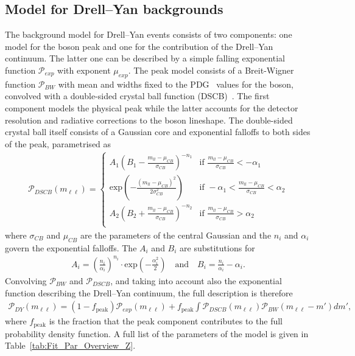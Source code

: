 \subsection{Model for Drell--Yan backgrounds}
\label{sec:Zmodel}
The background model for Drell--Yan events consists of two components: one model for the \Z boson peak and one for the contribution of the Drell--Yan continuum. The latter one can be described by a simple falling exponential function $\mathcal{P}_{exp}$ with exponent $\mu_{exp}$. The peak model consists of a Breit-Wigner function $\mathcal{P}_{BW}$ with mean and widths fixed to the PDG~\cite{PDG} values for the \Z boson, convolved with a double-sided crystal ball function (DSCB)~\cite{Crystal}. The first component models the physical peak while the latter accounts for the detector resolution and radiative corrections to the \Z boson lineshape. The double-sided crystal ball itself consists of a Gaussian core and exponential falloffs to both sides of the peak, parametrised as
\begin{eqnarray*}
\mathcal{P}_{DSCB}(m_{\ell\ell}) = \begin{cases} A_{1} (B_{1}-\frac{m_{ll}-\mu_{CB}}{\sigma_{CB}})^{-n_{1}} &\mbox{if } \frac{m_{ll}-\mu_{CB}}{\sigma_{CB}}<-\alpha_{1} \\
\textrm{exp}\left(-\frac{(m_{ll}-\mu_{CB})^2}{2\sigma_{CB}^2}\right) &\mbox{if } -\alpha_{1}<\frac{m_{ll}-\mu_{CB}}{\sigma_{CB}}<\alpha_{2} \\
A_{2} (B_{2}+\frac{m_{ll}-\mu_{CB}}{\sigma_{CB}})^{-n_{2}} &\mbox{if } \frac{m_{ll}-\mu_{CB}}{\sigma_{CB}}>\alpha_{2} \\
\end{cases}
\end{eqnarray*}
where $\sigma_{CB}$ and $\mu_{CB}$ are the parameters of the central Gaussian and the $n_i$ and $\alpha_i$ govern the exponential falloffs. The $A_i$ and $B_i$ are substitutions for
\begin{eqnarray*}
A_{i} = \left(\frac{n_{i}}{\alpha_{i}}\right)^{n_{i}} \cdot \textrm{exp}\left(-\frac{\alpha_{i}^2}{2}\right) \quad \textrm{and}\quad B_{i} = \frac{n_{i}}{\alpha_{i}}-\alpha_{i}.
\end{eqnarray*}
Convolving $\mathcal{P}_{BW}$ and $\mathcal{P}_{DSCB}$, and taking into account also the exponential function describing the Drell--Yan continuum, the full description is therefore 
\begin{eqnarray*}
\mathcal{P}_{DY} (m_{\ell\ell}) = (1-f_\text{peak})\mathcal{P}_{exp}(m_{\ell\ell})+ f_\text{peak}\int \mathcal{P}_{DSCB}(m_{\ell\ell})\mathcal{P}_{BW}(m_{\ell\ell}-m') dm',
\end{eqnarray*}
where $f_{\text{peak}}$ is the fraction that the peak component contributes to the full probability density function. A full list of the parameters of the model is given in Table~\ref{tab:Fit_Par_Overview_Z}.



